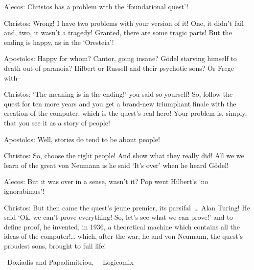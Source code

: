 \newpage

{

\narrower\parindent=0pt
\baselineskip

{\it

Alecos: Christos has a problem with the `foundational quest'!

Christos:  Wrong!  I have two problems with your  {\rm {version}} of it!  One, it
didn't fail and, two, it wasn't a tragedy!  Granted, there are some tragic
parts!  But the ending is happy, as in the `Oresteia'!  

Apostolos:  Happy for whom?  Cantor, going insane?  G\"odel starving himself to
death out of paranoia? Hilbert or Russell and their psychotic sons? Or Frege with--

Christos: `The meaning
is in the ending!' you said so yourself!  So, follow the quest for ten more years and
you get a brand-new triumphant finale with the creation of the computer, which is the
quest's real hero!   Your problem is, simply, that you see it as a story of people!

Apostolos: Well, stories do tend to be about people!

Christos:  So, choose the right people!  And show what they really did!  All we we learn
of the great von Neumann is he said `It's over'  when he heard G\"odel!

Alecos: But it was over in a sense, wasn't it?  Pop went Hilbert's `no ignorabimus'!

Christos:  But then came the quest's jeune premier, its parsifal~\dots{}  Alan Turing!
He said `Ok, we can't prove everything! So, let's see what we can prove!' and to define
proof, he invented, in 1936, a theoretical machine which contains all the ideas of the
computer!\dots{}  which, after the war, he and von Neumann, the quest's proudest sons,
brought to full life!

{\hfill\rm--Doxiadis and Papadimitriou, ~~Logicomix~\cite{Logicomix}} %

}

}




\newpage

